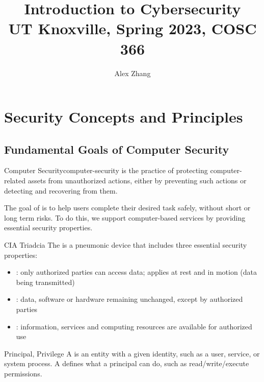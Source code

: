 \documentclass[12pt]{report}
\title{\textbf{Introduction to Cybersecurity}\\
\large UT Knoxville, Spring 2023, COSC 366}
\author{Alex Zhang}
\begin{document}
\maketitle
\tableofcontents

\chapter{Security Concepts and Principles}

\section{Fundamental Goals of Computer Security}

\begin{dfnbox}{Computer Security}{computer-security}
     is the practice of protecting computer-related assets from unauthorized actions, either by preventing such actions or detecting and recovering from them.
\end{dfnbox}

The goal of  is to help users complete their desired task safely, without short or long term risks.  To do this, we support computer-based services by providing essential security properties.

\begin{dfnbox}{CIA Triad}{cia}
    The  is a pneumonic device that includes three essential security properties:
    \begin{itemize}[noitemsep]
        \item {}: only authorized parties can access data; applies at rest and in motion (data being transmitted)
        \item {}: data, software or hardware remaining unchanged, except by authorized parties
        \item {}: information, services and computing resources are available for authorized use
    \end{itemize}
\end{dfnbox}

\begin{dfnbox}{Principal, Privilege}{}
    A  is an entity with a given identity, such as a user, service, or system process. A  defines what a principal can do, such as read/write/execute permissions.
\end{dfnbox}
\end{document}
